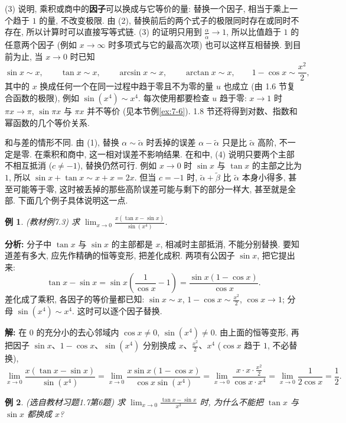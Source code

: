 \documentclass[UTF8,openany]{ctexbook}
\theoremstyle{chinesetextbook}
\newtheorem{example}{例}[section]
\newenvironment{cnsolution}{\par\indent\textbf{解:} \ignorespaces}{\par}
\begin{document}
(3) 说明, 乘积或商中的\textbf{因子}可以换成与它等价的量: 替换一个因子, 相当于乘上一个趋于 $1$ 的量, 不改变极限. 由 (2), 替换前后的两个式子的极限同时存在或同时不存在, 所以计算时可以直接写等式链. (3) 的证明只用到 $\displaystyle\frac\alpha{\widetilde\alpha}\to1$, 所以比值趋于 $1$ 的任意两个因子 (例如 $x\to\infty$ 时多项式与它的最高次项) 也可以这样互相替换. 到目前为止, 当 $x\to0$ 时已知
\[
\sin x\sim x,\qquad\tan x\sim x,\qquad\arcsin x\sim x,\qquad\arctan x\sim x,\qquad1-\cos x\sim\frac{x^2}2,
\]
其中的 $x$ 换成任何一个在同一过程中趋于零且不为零的量 $u$ 也成立 (由 1.6 节复合函数的极限), 例如 $\sin(x^4)\sim x^4$. 每次使用都要检查 $u$ 趋于零: $x\to1$ 时 $\pi x\to\pi$, $\sin\pi x$ 与 $\pi x$ 并不等价 (见本节例\ref{ex:7-6}). 1.8 节还将得到对数、指数和幂函数的几个等价关系.

和与差的情形不同. 由 (1), 替换 $\alpha\sim\widetilde\alpha$ 时丢掉的误差 $\alpha-\widetilde\alpha$ 只是比 $\widetilde\alpha$ 高阶, 不一定是零. 在乘积和商中, 这一相对误差不影响结果. 在和中, (4) 说明只要两个主部不相互抵消 ($c\ne-1$), 替换仍然可行. 例如 $x\to0$ 时 $\sin x$ 与 $\tan x$ 的主部之比为 $1$, 所以 $\sin x+\tan x\sim x+x=2x$. 但当 $c=-1$ 时, $\widetilde\alpha+\widetilde\beta$ 比 $\widetilde\alpha$ 本身小得多, 甚至可能等于零, 这时被丢掉的那些高阶误差可能与剩下的部分一样大, 甚至就是全部. 下面几个例子具体说明这一点.
\begin{example}\label{ex:7-3}
\textnormal{(教材例7.3)} 求 $\displaystyle\lim_{x\to0}\frac{x(\tan x-\sin x)}{\sin(x^4)}$.
\end{example}
\par\indent\textbf{分析:} 分子中 $\tan x$ 与 $\sin x$ 的主部都是 $x$, 相减时主部抵消, 不能分别替换. 要知道差有多大, 应先作精确的恒等变形, 把差化成积. 两项有公因子 $\sin x$, 把它提出来:
\[
\tan x-\sin x=\sin x\left(\frac1{\cos x}-1\right)=\frac{\sin x(1-\cos x)}{\cos x}.
\]
差化成了乘积, 各因子的等价量都已知: $\sin x\sim x$, $\displaystyle1-\cos x\sim\frac{x^2}2$, $\cos x\to1$; 分母 $\sin(x^4)\sim x^4$. 这时可以逐个因子替换.
\begin{cnsolution}
在 $0$ 的充分小的去心邻域内 $\cos x\ne0$, $\sin(x^4)\ne0$. 由上面的恒等变形, 再把因子 $\sin x$、$1-\cos x$、$\sin(x^4)$ 分别换成 $x$、$\displaystyle\frac{x^2}2$、$x^4$ ($\cos x$ 趋于 $1$, 不必替换),
\[
\lim_{x\to0}\frac{x(\tan x-\sin x)}{\sin(x^4)}=\lim_{x\to0}\frac{x\sin x(1-\cos x)}{\cos x\sin(x^4)}=\lim_{x\to0}\frac{x\cdot x\cdot\frac{x^2}2}{\cos x\cdot x^4}=\lim_{x\to0}\frac1{2\cos x}=\frac12.
\]
\end{cnsolution}
\begin{example}
\textnormal{(选自教材习题1.7第6题)} 求 $\displaystyle\lim_{x\to0}\frac{\tan x-\sin x}{x^3}$ 时, 为什么不能把 $\tan x$ 与 $\sin x$ 都换成 $x$?
\end{example}
\end{document}

